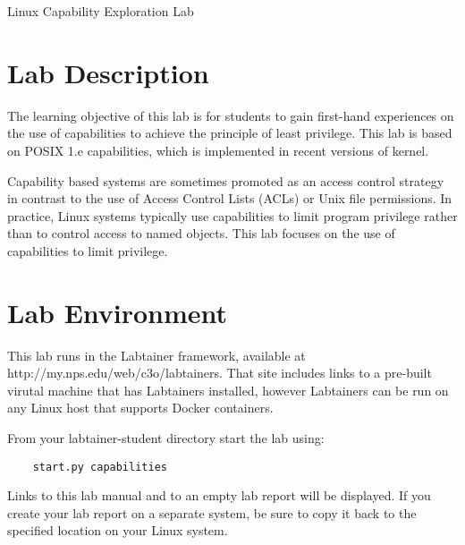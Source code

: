 




\begin{center}
{\LARGE Linux Capability Exploration Lab}
\end{center}

\copyrightnotice

\section{Lab Description}

The learning objective of this lab is for students
to gain first-hand experiences on the
use of capabilities to achieve the principle of least privilege.
This lab is based on POSIX 1.e capabilities, which is implemented in
recent versions of \linux kernel.

Capability based systems are sometimes promoted as an access control
strategy in contrast to the use of Access Control Lists (ACLs) or
Unix file permissions.  In practice, Linux systems typically use 
capabilities to limit program privilege rather than to control
access to named objects.  This lab focuses on the use of capabilities
to limit privilege.

\section{Lab Environment}
This lab runs in the Labtainer framework,
available at http://my.nps.edu/web/c3o/labtainers.
That site includes links to a pre-built virutal machine
that has Labtainers installed, however Labtainers can
be run on any Linux host that supports Docker containers.

From your labtainer-student directory start the lab using:
\begin{verbatim}
    start.py capabilities
\end{verbatim}
Links to this lab manual and to an empty lab report will be displayed.  If you create your lab report on a separate system,
be sure to copy it back to the specified location on your Linux system.


